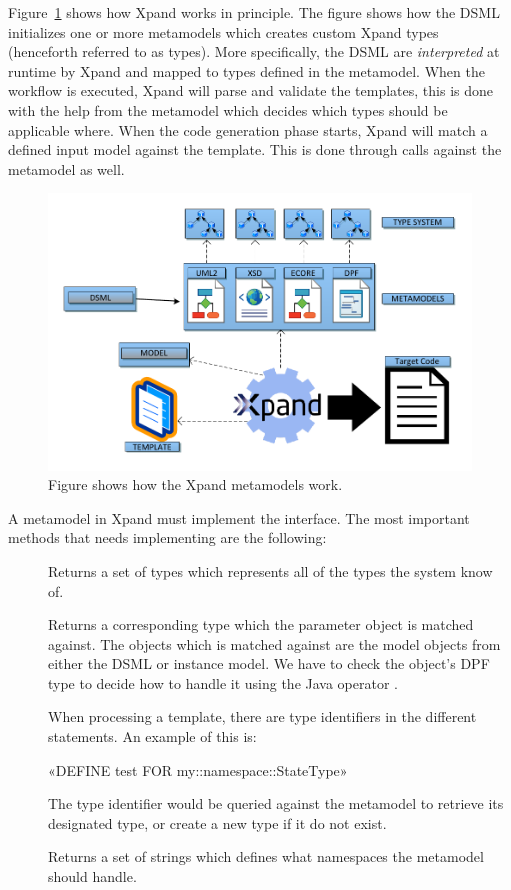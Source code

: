 Figure~\ref{fig:xpand_overview} shows how Xpand works in principle. The figure shows how the DSML initializes one or more metamodels which creates custom Xpand types (henceforth referred to as types). More specifically, the DSML are \emph{interpreted} at runtime by Xpand and mapped to types defined in the metamodel. When the workflow is executed, Xpand will parse and validate the templates, this is done with the help from the metamodel which decides which types should be applicable where. When the code generation phase starts, Xpand will match a defined input model against the template. This is done through calls against the metamodel as well.

\begin{figure}[h]
  \centering
  \centerline{\includegraphics[scale=0.7]{images/xpand.pdf}}
  \caption[Xpand metamodels]{Figure shows how the Xpand metamodels work.}
  \label{fig:xpand_overview}
\end{figure}

A metamodel in Xpand must implement the  interface. The most important methods that needs implementing are the following:
\begin{description}
  \item[] Returns a set of types which represents all of the types the system know of.
  \item[] Returns a corresponding type which the parameter object is matched against. The objects which is matched against  are the model objects from either the DSML or instance model. We have to check the object's DPF type to decide how to handle it using the Java operator .
  \item[] When processing a template, there are type identifiers in the different statements. An example of this is:
  \begin{plainlisting}
«DEFINE test FOR my::namespace::StateType»
  \end{plainlisting}
  The type identifier  would be queried against the metamodel to retrieve its designated type, or create a new type if it do not exist.
  \item[] Returns a set of strings which defines what namespaces the metamodel should handle.
\end{description}

